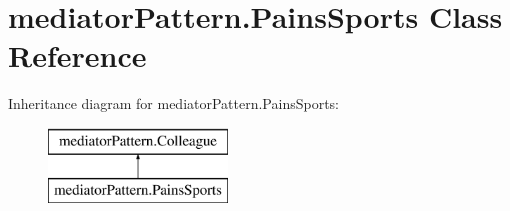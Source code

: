 \hypertarget{classmediator_pattern_1_1_pains_sports}{}\section{mediator\+Pattern.\+Pains\+Sports Class Reference}
\label{classmediator_pattern_1_1_pains_sports}
Inheritance diagram for mediator\+Pattern.\+Pains\+Sports\+:\begin{figure}[H]
\begin{center}
\leavevmode
\includegraphics[height=2.000000cm]{classmediator_pattern_1_1_pains_sports}
\end{center}
\end{figure}
